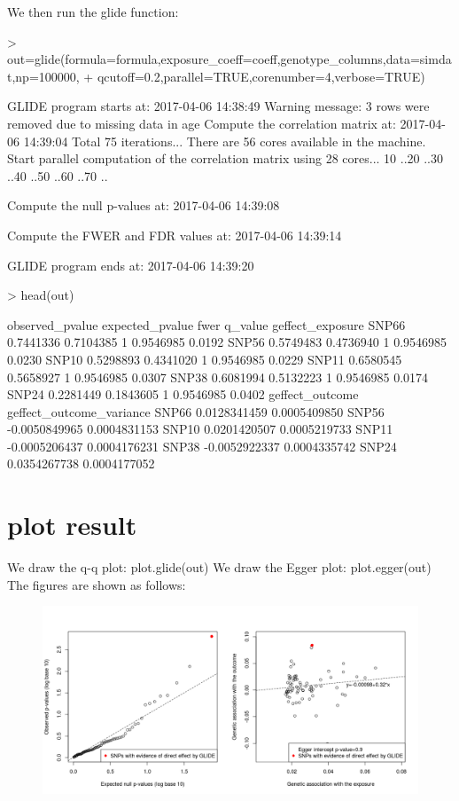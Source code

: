 \documentclass[12pt]{article}
\begin{document}
We then run the glide function:
\begin{Schunk}
\begin{Sinput}
> out=glide(formula=formula,exposure_coeff=coeff,genotype_columns,data=simdat,np=100000,
+ qcutoff=0.2,parallel=TRUE,corenumber=4,verbose=TRUE)
\end{Sinput}
\begin{Soutput}
GLIDE program starts at: 2017-04-06 14:38:49
Warning message: 3 rows were removed due to missing data in age
Compute the correlation matrix at: 2017-04-06 14:39:04
Total 75 iterations... 
There are 56 cores available in the machine.
Start parallel computation of the correlation matrix using 28 cores...
10 ..20 ..30 ..40 ..50 ..60 ..70 ..

Compute the null p-values at: 2017-04-06 14:39:08

Compute the FWER and FDR values at: 2017-04-06 14:39:14

GLIDE program ends at: 2017-04-06 14:39:20
\end{Soutput}
\begin{Sinput}
> head(out)
\end{Sinput}
\begin{Soutput}
      observed_pvalue expected_pvalue fwer   q_value geffect_exposure
SNP66       0.7441336       0.7104385    1 0.9546985           0.0192
SNP56       0.5749483       0.4736940    1 0.9546985           0.0230
SNP10       0.5298893       0.4341020    1 0.9546985           0.0229
SNP11       0.6580545       0.5658927    1 0.9546985           0.0307
SNP38       0.6081994       0.5132223    1 0.9546985           0.0174
SNP24       0.2281449       0.1843605    1 0.9546985           0.0402
      geffect_outcome geffect_outcome_variance
SNP66    0.0128341459             0.0005409850
SNP56   -0.0050849965             0.0004831153
SNP10    0.0201420507             0.0005219733
SNP11   -0.0005206437             0.0004176231
SNP38   -0.0052922337             0.0004335742
SNP24    0.0354267738             0.0004177052
\end{Soutput}
\end{Schunk}

\section{plot result}
We draw the q-q plot: plot.glide(out)
We draw the Egger plot: plot.egger(out)
The figures are shown as follows:
\begin{figure}[h]\includegraphics{./plot.png}\end{figure}
\end{document}
